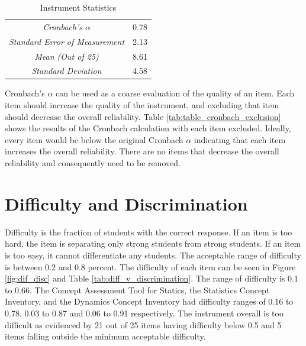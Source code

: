 
\begin{table}[!htbp]
\caption{Instrument Statistics}
\centering
\begin{tabular}{cc}
    \toprule
    \textit{Cronbach's $\alpha$} & 0.78 \\
    \textit{Standard Error of Measurement} & 2.13 \\
    \textit{Mean (Out of 25)} & 8.61\\
    \textit{Standard Deviation} & 4.58\\
    \bottomrule
\end{tabular}
\label{tab:overall}
\end{table}


Cronbach's $\alpha$ can be used as a coarse evaluation of the quality of an item. Each item should increase the quality of the instrument, and excluding that item should decrease the overall reliability. Table \ref{tab:table_cronbach_exclusion} shows the results of the Cronbach calculation with each item excluded. Ideally, every item would be below the original Cronbach $\alpha$ indicating that each item increases the overall reliability. There are no items that decrease the overall reliability and consequently need to be removed.

\iffalse
\iflong
\begin{figure}[ht]
    \begin{center}
    \advance\leftskip-.25cm
    \advance\rightskip-.25cm
    \texttt{[image: images/Cronobach's.png]}
    \caption{Cronbach's $\alpha$ with Items Excluded}
    \label{fig:cron}
\end{center}
\end{figure}
\fi
\fi


\FloatBarrier
\section{Difficulty and Discrimination}

Difficulty is the fraction of students with the correct response. If an item is too hard, the item is separating only strong students from strong students. If an item is too easy, it cannot differentiate any students. The acceptable range of difficulty is between 0.2 and 0.8 percent. The difficulty of each item can be seen in Figure \ref{fig:dif_disc} and Table \ref{tab:diff_v_discrimination}. The range of difficulty is 0.1 to 0.66. The Concept Assessment Tool for Statics, the Statistics Concept Inventory, and the Dynamics Concept Inventory had difficulty ranges of 0.16 to 0.78, 0.03 to 0.87 and 0.06 to 0.91 respectively. The instrument overall is too difficult as evidenced by 21 out of 25 items having difficulty below 0.5 and 5 items falling outside the minimum acceptable difficulty. 

